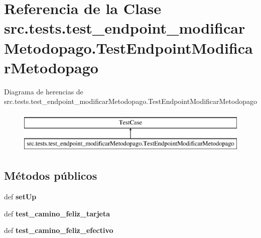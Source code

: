 \hypertarget{classsrc_1_1tests_1_1test__endpoint__modificar_metodopago_1_1_test_endpoint_modificar_metodopago}{\section{Referencia de la Clase src.\-tests.\-test\-\_\-endpoint\-\_\-modificar\-Metodopago.\-Test\-Endpoint\-Modificar\-Metodopago}
\label{classsrc_1_1tests_1_1test__endpoint__modificar_metodopago_1_1_test_endpoint_modificar_metodopago}
}
Diagrama de herencias de src.\-tests.\-test\-\_\-endpoint\-\_\-modificar\-Metodopago.\-Test\-Endpoint\-Modificar\-Metodopago\begin{figure}[H]
\begin{center}
\leavevmode
\includegraphics[height=2.000000cm]{classsrc_1_1tests_1_1test__endpoint__modificar_metodopago_1_1_test_endpoint_modificar_metodopago}
\end{center}
\end{figure}
\subsection*{Métodos públicos}
\begin{DoxyCompactItemize}
\item 
\hypertarget{classsrc_1_1tests_1_1test__endpoint__modificar_metodopago_1_1_test_endpoint_modificar_metodopago_a0cd2fa228da5eb9e97b6799c7bd720a3}{def {\bfseries set\-Up}}\label{classsrc_1_1tests_1_1test__endpoint__modificar_metodopago_1_1_test_endpoint_modificar_metodopago_a0cd2fa228da5eb9e97b6799c7bd720a3}

\item 
\hypertarget{classsrc_1_1tests_1_1test__endpoint__modificar_metodopago_1_1_test_endpoint_modificar_metodopago_a7cee5a096b6e26144e8a9ed0a54428e3}{def {\bfseries test\-\_\-camino\-\_\-feliz\-\_\-tarjeta}}\label{classsrc_1_1tests_1_1test__endpoint__modificar_metodopago_1_1_test_endpoint_modificar_metodopago_a7cee5a096b6e26144e8a9ed0a54428e3}

\item 
\hypertarget{classsrc_1_1tests_1_1test__endpoint__modificar_metodopago_1_1_test_endpoint_modificar_metodopago_a38f40b5c6a915e7fec02c6ed5e669979}{def {\bfseries test\-\_\-camino\-\_\-feliz\-\_\-efectivo}}\label{classsrc_1_1tests_1_1test__endpoint__modificar_metodopago_1_1_test_endpoint_modificar_metodopago_a38f40b5c6a915e7fec02c6ed5e669979}

\end{DoxyCompactItemize}
